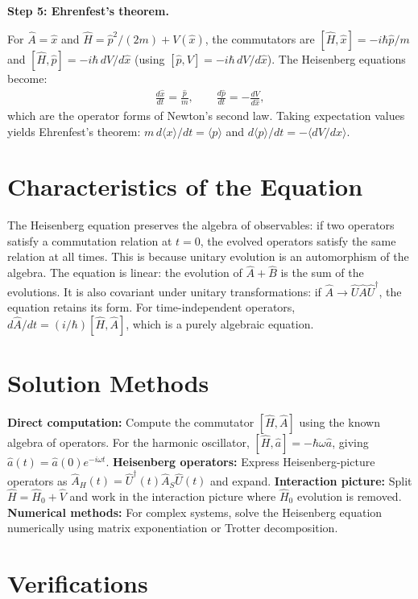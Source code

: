 \documentclass[11pt,openright]{book}
\begin{document}
\textbf{Step 5: Ehrenfest's theorem.}

For $\hat{A} = \hat{x}$ and $\hat{H} = \hat{p}^2/(2m) + V(\hat{x})$, the commutators are $[\hat{H}, \hat{x}] = -i\hbar\hat{p}/m$ and $[\hat{H}, \hat{p}] = -i\hbar\,dV/d\hat{x}$ (using $[\hat{p}, V] = -i\hbar\,dV/d\hat{x}$). The Heisenberg equations become:
\begin{align}
\frac{d\hat{x}}{dt} = \frac{\hat{p}}{m}, \qquad \frac{d\hat{p}}{dt} = -\frac{dV}{d\hat{x}},
\end{align}
which are the operator forms of Newton's second law. Taking expectation values yields Ehrenfest's theorem: $m\,d\langle x\rangle/dt = \langle p\rangle$ and $d\langle p\rangle/dt = -\langle dV/dx\rangle$.

\section*{Characteristics of the Equation}

The Heisenberg equation preserves the algebra of observables: if two operators satisfy a commutation relation at $t = 0$, the evolved operators satisfy the same relation at all times. This is because unitary evolution is an automorphism of the algebra. The equation is linear: the evolution of $\hat{A} + \hat{B}$ is the sum of the evolutions. It is also covariant under unitary transformations: if $\hat{A} \to \hat{U}\hat{A}\hat{U}^\dagger$, the equation retains its form. For time-independent operators, $d\hat{A}/dt = (i/\hbar)[\hat{H}, \hat{A}]$, which is a purely algebraic equation.
\section*{Solution Methods}

\textbf{Direct computation:} Compute the commutator $[\hat{H}, \hat{A}]$ using the known algebra of operators. For the harmonic oscillator, $[\hat{H}, \hat{a}] = -\hbar\omega\hat{a}$, giving $\hat{a}(t) = \hat{a}(0)e^{-i\omega t}$. \textbf{Heisenberg operators:} Express Heisenberg-picture operators as $\hat{A}_H(t) = \hat{U}^\dagger(t)\hat{A}_S\hat{U}(t)$ and expand. \textbf{Interaction picture:} Split $\hat{H} = \hat{H}_0 + \hat{V}$ and work in the interaction picture where $\hat{H}_0$ evolution is removed. \textbf{Numerical methods:} For complex systems, solve the Heisenberg equation numerically using matrix exponentiation or Trotter decomposition.
\section*{Verifications}
\end{document}
